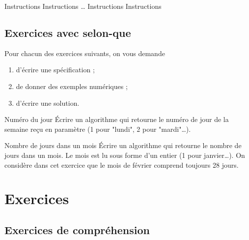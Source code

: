 	\begin{LDA}
				\Stmt Instructions
				\Stmt Instructions
			\Empty \dots
				\Stmt Instructions
				\Stmt Instructions
		\EndSwitch
	\end{LDA}
	
	\subsection{Exercices avec selon-que}
	
		Pour chacun des exercices suivants,
		on vous demande
		\begin{enumerate}
		\item
			d'écrire une spécification ;
		\item
			de donner des exemples numériques ;
		\item
			d'écrire une solution.
		\end{enumerate}
		
		\begin{Exercice}{Numéro du jour}
			Écrire un algorithme qui retourne le numéro de jour de la semaine
			reçu en paramètre (1 pour "lundi", 2 pour "mardi"\dots).
		\end{Exercice}
		
		\begin{Exercice}{Nombre de jours dans un mois}
			Écrire un algorithme qui retourne le nombre de jours dans un mois. 
			Le mois est lu sous forme d’un entier (1 pour janvier\dots).
			On considère dans cet exercice que le mois de février
			comprend toujours 28 jours.
		\end{Exercice}
		
\section{Exercices}

	\subsection{Exercices de compréhension}
	

